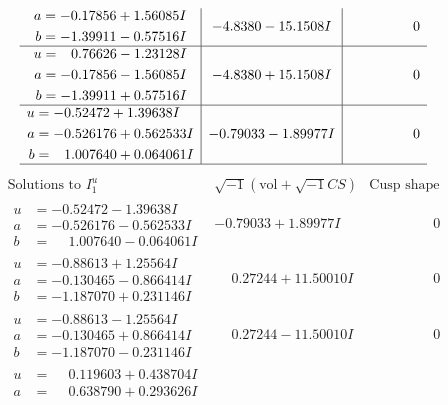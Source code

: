 \documentclass[1p]{elsarticle_modified}
\theoremstyle{definition}
\newcommand{\I}{\sqrt{-1}}
\begin{document}
$$\begin{array}{c|c|c}
\begin{aligned}
a &= -0.17856 + 1.56085 I \\
b &= -1.39911 - 0.57516 I\end{aligned}
 & -4.8380 - 15.1508 I & \phantom{-0.000000 } 0 \\ \hline\begin{aligned}
u &= \phantom{-}0.76626 - 1.23128 I \\
a &= -0.17856 - 1.56085 I \\
b &= -1.39911 + 0.57516 I\end{aligned}
 & -4.8380 + 15.1508 I & \phantom{-0.000000 } 0 \\ \hline\begin{aligned}
u &= -0.52472 + 1.39638 I \\
a &= -0.526176 + 0.562533 I \\
b &= \phantom{-}1.007640 + 0.064061 I\end{aligned}
 & -0.79033 - 1.89977 I & \phantom{-0.000000 } 0\\
 \hline 
 \end{array}$$\newpage$$\begin{array}{c|c|c}  
\text{Solutions to }I^u_{1}& \I (\text{vol} + \sqrt{-1}CS) & \text{Cusp shape}\\
 \hline 
\begin{aligned}
u &= -0.52472 - 1.39638 I \\
a &= -0.526176 - 0.562533 I \\
b &= \phantom{-}1.007640 - 0.064061 I\end{aligned}
 & -0.79033 + 1.89977 I & \phantom{-0.000000 } 0 \\ \hline\begin{aligned}
u &= -0.88613 + 1.25564 I \\
a &= -0.130465 - 0.866414 I \\
b &= -1.187070 + 0.231146 I\end{aligned}
 & \phantom{-}0.27244 + 11.50010 I & \phantom{-0.000000 } 0 \\ \hline\begin{aligned}
u &= -0.88613 - 1.25564 I \\
a &= -0.130465 + 0.866414 I \\
b &= -1.187070 - 0.231146 I\end{aligned}
 & \phantom{-}0.27244 - 11.50010 I & \phantom{-0.000000 } 0 \\ \hline\begin{aligned}
u &= \phantom{-}0.119603 + 0.438704 I \\
a &= \phantom{-}0.638790 + 0.293626 I \\

\end{aligned}
\end{array}$$
\end{document}
